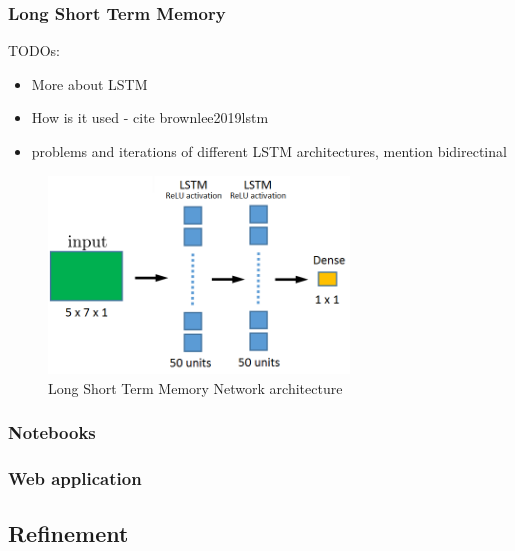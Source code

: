 \documentclass{article}
\begin{document}
\subsubsection{Long Short Term Memory}

\color{red}
TODOs:
\begin{itemize}
    \item More about LSTM
    \item How is it used - cite brownlee2019lstm
    \item problems and iterations of different LSTM architectures, mention bidirectinal
\end{itemize}
\color{black}

\begin{figure}[h!]
\centering
\includegraphics[width=8cm]{imgs/lstm.png}
\caption{Long Short Term Memory Network architecture}
\label{fig:lstm}
\end{figure}

\subsubsection{Notebooks}
\subsubsection{Web application}

\subsection{Refinement}
\end{document}
